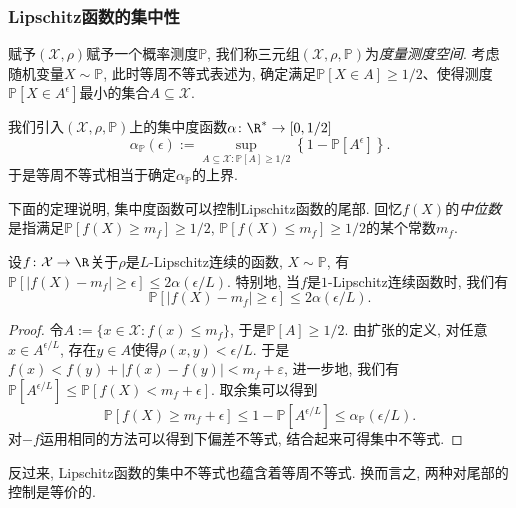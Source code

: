 \subsubsection{Lipschitz函数的集中性}

赋予$(\mathcal{X}, \rho)$赋予一个概率测度$\mathbb{P}$, 我们称三元组$(\mathcal{X}, \rho, \mathbb{P})$为\emph{度量测度空间}. 
考虑随机变量$X \sim \mathbb{P}$,  此时等周不等式表述为, 确定满足$\mathbb{P}[X \in A] \geq 1/2$、使得测度$\mathbb{P}[X \in A^{\epsilon}]$最小的集合$A \subseteq \mathcal{X}$.

我们引入$(\mathcal{X}, \rho, \mathbb{P})$上的集中度函数$\alpha \colon \R^* \to [0, 1/2]$
\begin{equation*}
	\alpha_{\mathbb{P}}(\epsilon)
	:= \sup_{A \subseteq \mathcal{X} \colon \mathbb{P}[A] \geq 1/2} \left\{ 1 - \mathbb{P}[A^{\epsilon}] \right\}. 
\end{equation*}
于是等周不等式相当于确定$\alpha_{\mathbb{P}}$的上界. 

下面的定理说明, 集中度函数可以控制Lipschitz函数的尾部. 
回忆$f(X)$的\emph{中位数}是指满足$\mathbb{P}[f(X) \geq m_f] \geq 1/2$, $\mathbb{P}[f(X) \leq m_f] \geq 1/2$的某个常数$m_f$. 

\begin{theorem}[Lévy不等式]
	设$f \colon \mathcal{X} \to \R$关于$\rho$是$L$-Lipschitz连续的函数, $X \sim \mathbb{P}$, 有$\mathbb{P}[ |f(X) - m_f| \geq \epsilon] \leq 2 \alpha(\epsilon / L)$. 
	特别地, 当$f$是$1$-Lipschitz连续函数时, 我们有
	\begin{equation*}
		\mathbb{P}[ |f(X) - m_f| \geq \epsilon] \leq 2 \alpha(\epsilon / L). 
	\end{equation*}
\end{theorem}
\begin{proof}
	令$A := \{x \in \mathcal{X} \colon f(x) \leq m_f\}$, 于是$\mathbb{P}[A] \geq 1/2$. 
	由扩张的定义, 对任意$x \in A^{\epsilon / L}$, 存在$y \in A$使得$\rho(x,y) < \epsilon / L$. 
	于是$f(x) < f(y) + |f(x) - f(y)| < m_f + \varepsilon$, 进一步地, 我们有$\mathbb{P}[A^{\epsilon / L}] \leq \mathbb{P}[f(X) < m_f + \epsilon]$. 
	取余集可以得到
	\begin{equation*}
		\mathbb{P}[f(X) \geq m_f + \epsilon] 
		\leq 1 - \mathbb{P}[A^{\epsilon / L}] 
		\leq \alpha_{\mathbb{P}}(\epsilon / L). 
	\end{equation*}
	对$-f$运用相同的方法可以得到下偏差不等式, 结合起来可得集中不等式. 
\end{proof}

反过来, Lipschitz函数的集中不等式也蕴含着等周不等式. 
换而言之, 两种对尾部的控制是等价的. 

